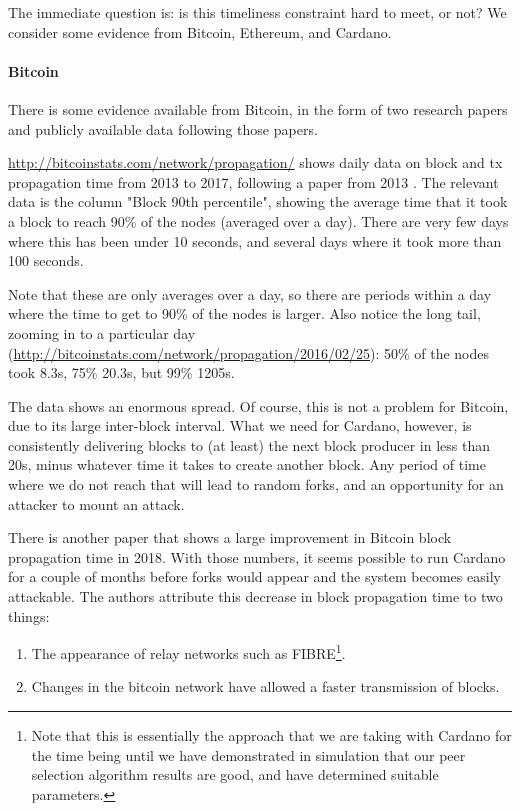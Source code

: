 \documentclass[11pt,a4paper]{article}
\begin{document}
The immediate question is: is this timeliness constraint hard to meet,
or not? We consider some evidence from Bitcoin, Ethereum, and Cardano.

\paragraph{Bitcoin}
\label{bitcoin}

There is some evidence available from Bitcoin, in the form of two
research papers and publicly available data following those papers.

\href{http://bitcoinstats.com/network/propagation/}{{http://bitcoinstats.com/network/propagation/}}
shows daily data on block and tx propagation time from 2013 to 2017,
following a paper from 2013 \cite{DW13}. The relevant data is the column
"Block 90th percentile", showing the average time that it took a block
to reach 90\% of the nodes (averaged over a day). There are very few
days where this has been under 10 seconds, and several days where it
took more than 100 seconds.

Note that these are only averages over a day, so there are periods
within a day where the time to get to 90\% of the nodes is larger. Also
notice the long tail, zooming in to a particular day
(\href{http://bitcoinstats.com/network/propagation/2016/02/25}{{http://bitcoinstats.com/network/propagation/2016/02/25}}):
50\% of the nodes took 8.3s, 75\% 20.3s, but 99\% 1205s.

The data shows an enormous spread. Of course, this is not a problem for
Bitcoin, due to its large inter-block interval. What we need for
Cardano, however, is consistently delivering blocks to (at least) the
next block producer in less than 20s, minus whatever time it takes to
create another block. Any period of time where we do not reach that will
lead to random forks, and an opportunity for an attacker to mount an
attack.

There is another paper \cite{N18} that shows a large improvement in
Bitcoin block propagation time in 2018. With those numbers, it seems
possible to run Cardano for a couple of months before forks would appear
and the system becomes easily attackable. The authors attribute this
decrease in block propagation time to two things:

\begin{enumerate}
\item
  The appearance of relay networks such as FIBRE\footnote{Note that this
    is essentially the approach that we are taking with Cardano for the
    time being until we have demonstrated in simulation that our peer
    selection algorithm results are good, and have determined suitable
    parameters.}.
\item
  Changes in the bitcoin network have allowed a faster transmission of
  blocks.
\end{enumerate}
\end{document}
